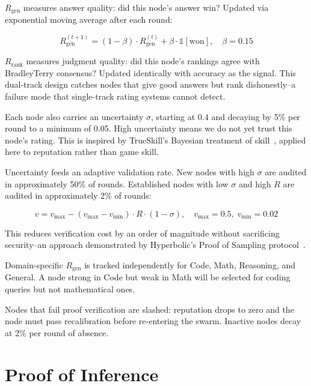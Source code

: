 \documentclass[11pt,a4paper]{article}
\begin{document}
$R_{\text{gen}}$ measures answer quality: did this node's answer win? Updated via exponential moving average after each round:

\begin{equation}
R_{\text{gen}}^{(t+1)} = (1 - \beta) \cdot R_{\text{gen}}^{(t)} + \beta \cdot \mathbb{1}[\text{won}], \quad \beta = 0.15
\end{equation}

$R_{\text{rank}}$ measures judgment quality: did this node's rankings agree with BradleyTerry consensus? Updated identically with accuracy as the signal. This dual-track design catches nodes that give good answers but rank dishonestly--a failure mode that single-track rating systems cannot detect.

Each node also carries an uncertainty $\sigma$, starting at 0.4 and decaying by 5\% per round to a minimum of 0.05. High uncertainty means we do not yet trust this node's rating. This is inspired by TrueSkill's Bayesian treatment of skill~\cite{trueskill}, applied here to reputation rather than game skill.

Uncertainty feeds an adaptive validation rate. New nodes with high $\sigma$ are audited in approximately 50\% of rounds. Established nodes with low $\sigma$ and high $R$ are audited in approximately 2\% of rounds:

\begin{equation}
v = v_{\max} - (v_{\max} - v_{\min}) \cdot R \cdot (1 - \sigma), \quad v_{\max} = 0.5, \; v_{\min} = 0.02
\end{equation}

This reduces verification cost by an order of magnitude without sacrificing security--an approach demonstrated by Hyperbolic's Proof of Sampling protocol~\cite{posp}.

Domain-specific $R_{\text{gen}}$ is tracked independently for Code, Math, Reasoning, and General. A node strong in Code but weak in Math will be selected for coding queries but not mathematical ones.

Nodes that fail proof verification are slashed: reputation drops to zero and the node must pass recalibration before re-entering the swarm. Inactive nodes decay at 2\% per round of absence.

\section{Proof of Inference}
\end{document}
